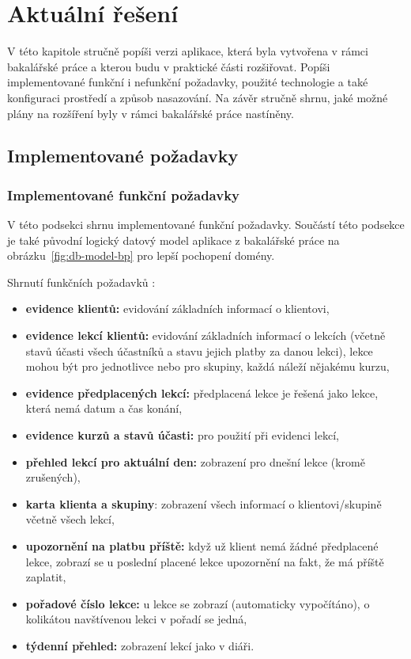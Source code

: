 \chapter{Aktuální řešení}

V této kapitole stručně popíši verzi aplikace, která byla vytvořena v rámci bakalářské práce \cite{bp} a kterou budu v praktické části rozšiřovat. Popíši implementované funkční i nefunkční požadavky, použité technologie a také konfiguraci prostředí a způsob nasazování. Na závěr stručně shrnu, jaké možné plány na rozšíření byly v rámci bakalářské práce nastíněny.

\section{Implementované požadavky}

\subsection{Implementované funkční požadavky}

V této podsekci shrnu implementované funkční požadavky. Součástí této podsekce je také původní logický datový model aplikace z bakalářské práce \cite{bp} na obrázku~\ref{fig:db-model-bp} pro lepší pochopení domény.

Shrnutí funkčních požadavků \cite{bp}:
\begin{itemize}
    \item \textbf{evidence klientů:} evidování základních informací o klientovi,
    \item \textbf{evidence lekcí klientů:} evidování základních informací o lekcích (včetně stavů účasti všech účastníků a stavu jejich platby za danou lekci), lekce mohou být pro jednotlivce nebo pro skupiny, každá náleží nějakému kurzu,
    \item \textbf{evidence předplacených lekcí:} předplacená lekce je řešená jako lekce, která nemá datum a čas konání,
    \item \textbf{evidence kurzů a stavů účasti:} pro použití při evidenci lekcí,
    \item \textbf{přehled lekcí pro aktuální den:} zobrazení pro dnešní lekce (kromě zrušených),
    \item \textbf{karta klienta a skupiny}: zobrazení všech informací o klientovi/skupině včetně všech lekcí,
    \item \textbf{upozornění na platbu příště:} když už klient nemá žádné předplacené lekce, zobrazí se u poslední placené lekce upozornění na fakt, že má příště zaplatit,
    \item \textbf{pořadové číslo lekce:} u lekce se zobrazí (automaticky vypočítáno), o kolikátou navštívenou lekci v pořadí se jedná,
    \item \textbf{týdenní přehled:} zobrazení lekcí jako v diáři.
\end{itemize}

